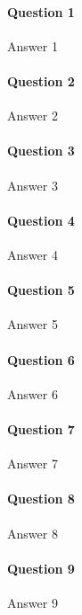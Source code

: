 \documentclass{ds-report}
\begin{document}
	\maketitle

	\paragraph{Question 1} 
	Answer 1
	
	\paragraph{Question 2} 
	Answer 2
	
	\paragraph{Question 3} 
	Answer 3
	
	\paragraph{Question 4} 
	Answer 4
	
	\paragraph{Question 5} 
	Answer 5
	
	\paragraph{Question 6} 
	Answer 6
	
	\paragraph{Question 7} 
	Answer 7
	
	\paragraph{Question 8} 
	Answer 8
	
	\paragraph{Question 9} 
	Answer 9
	
	\clearpage
	
	
\end{document}
